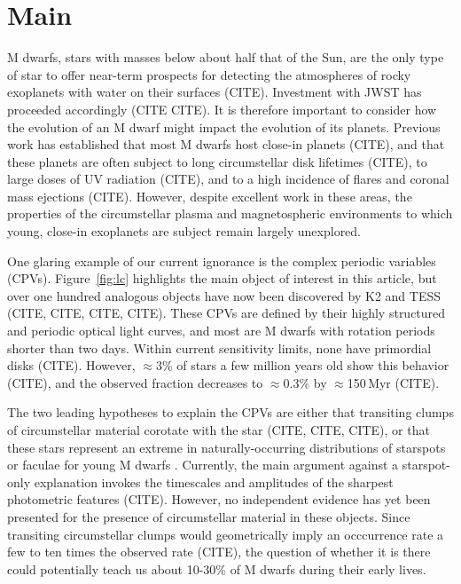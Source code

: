 \documentclass{nature3}
\begin{document}

\section{Main}
\label{sec:main}

M dwarfs, stars with masses below about half that of the Sun, are the
only type of star to offer near-term prospects for detecting the
atmospheres of rocky exoplanets with water on their surfaces (CITE).
Investment with JWST has proceeded accordingly (CITE CITE).  It is
therefore important to consider how the evolution of an M dwarf might
impact the evolution of its planets.  Previous work has established
that most M dwarfs host close-in planets (CITE), and that these
planets are often subject to long circumstellar disk lifetimes (CITE),
to large doses of UV radiation (CITE), and to a high incidence of
flares and coronal mass ejections (CITE).  However, despite excellent
work in these areas, the properties of the circumstellar plasma
and magnetospheric environments to which young, close-in exoplanets
are subject remain largely unexplored. 

One glaring example of our current ignorance is the complex periodic
variables (CPVs).  Figure~\ref{fig:lc} highlights the main object of
interest in this article, but over one hundred analogous objects have
now been discovered by K2 and TESS (CITE, CITE, CITE, CITE).  These CPVs are
defined by their highly structured and periodic optical light curves, 
and most are M dwarfs with rotation periods shorter than two days.
Within current sensitivity limits, none have primordial disks (CITE).
However, $\approx$3\% of stars a few million years old show this
behavior (CITE), and the observed fraction decreases to $\approx$0.3\%
by $\approx$150\,Myr (CITE).

The two leading hypotheses to explain the CPVs are either that
transiting clumps of circumstellar material corotate with the star
(CITE, CITE, CITE), or that these stars represent an extreme in
naturally-occurring distributions of starspots or faculae for young M
dwarfs \cite{Koen2021}.  Currently, the main argument against a
starspot-only explanation invokes the timescales and amplitudes of the
sharpest photometric features (CITE).  However, no independent
evidence has yet been presented for the presence of circumstellar
material in these objects.  Since transiting circumstellar
clumps would geometrically imply an occcurrence rate a few to ten
times the observed rate (CITE), the question of whether it is there
could potentially teach us about 10-30\% of M dwarfs during their
early lives.
\end{document}
